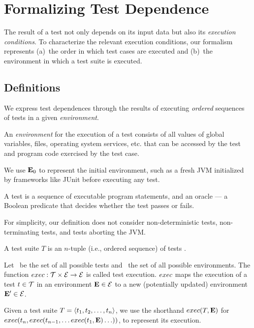 
\section{Formalizing Test Dependence}
\label{sec:formalism}


The result of a test not only depends on
its input data but also its \emph{execution conditions}.
To characterize the relevant execution conditions, 
our formalism represents
(a)~the order in which test cases are executed and (b)~the environment in which a test suite is executed.  


\subsection{Definitions}
\label{sec:definitions}

We express test dependences through the results of executing
\emph{ordered} sequences of tests in a given \emph{environment}.


\begin{definition}[Environment]
An \emph{environment} \env for the execution of a test
consists of all values of global variables, files,
operating
system services, etc. that
can be accessed by the test and program code exercised by the test
case.
\end{definition}

We use $\mathbf{E}_0$ to represent the initial environment, such
as a fresh JVM initialized by frameworks like JUnit
before executing any test.


\begin{definition}[Test]

A test is a sequence of executable program statements, and an oracle
--- a Boolean predicate that
decides whether the test passes or fails.
\end{definition}

For simplicity, our definition does not consider non-deter\-min\-istic
tests, non-terminating tests, and tests aborting the JVM.


\begin{definition}
A test suite\/ $T$ is an $n$-tuple (i.e., ordered sequence) of tests
.

\end{definition}


\begin{definition}
Let\/ \alltests\ be the set of all possible
tests and\/ \environs\ the set of all possible
environments.
The function\/ $exec: \mathcal{T} \times \mathcal{E} \rightarrow
\mathcal{E}$ is called test
execution. $exec$ maps the execution of a test\/ $ t \in
\mathcal{T}$ 
in an environment\/ $\mathbf{E} \in \mathcal{E}$ to a new (potentially updated)
environment\/ $\mathbf{E}' \in \mathcal{E}$.

Given a test suite\/ $T =  \langle t_1, t_2, \dots, t_n \rangle $,
we use the shorthand\/
$exec(T,\mathbf{E})$ for $exec(t_n,exec(t_{n-1},{\dots exec(t_1,\mathbf{E}) \dots }))$, to represent its execution.
\end{definition}

